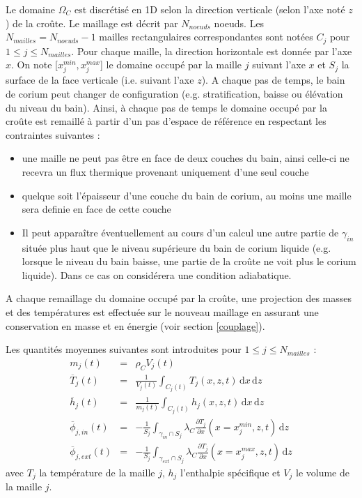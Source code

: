Le domaine $\Omega_C$ est discrétisé en 1D selon la direction verticale (selon l'axe noté $z$) de la croûte. Le maillage est décrit par $N_{noeuds}$ noeuds. Les $N_{mailles}=N_{noeuds}-1$ mailles rectangulaires correspondantes sont notées $C_j$ pour $1 \leq j\leq N_{mailles}$. Pour chaque maille, la direction horizontale est donnée par l'axe $x$. On note [$x_j^{min}, x_j^{max}$] le domaine occupé par la maille $j$ suivant l'axe $x$ et $S_j$ la surface de la face verticale (i.e. suivant l'axe $z$). A chaque pas de temps, le bain de corium peut changer de configuration (e.g. stratification, baisse ou élévation du niveau du bain). Ainsi, à chaque pas de temps le domaine occupé par la croûte est remaillé à partir d'un pas d'espace de référence en respectant les contraintes suivantes :
\begin{itemize}
    \item une maille ne peut pas être en face de deux couches du bain, ainsi celle-ci ne recevra un flux thermique provenant uniquement d'une seul couche
    \item quelque soit l'épaisseur d'une couche du bain de corium, au moins une maille sera definie en face de cette couche
    \item  Il peut apparaître éventuellement au cours d'un calcul une autre partie de $\gamma_{in}$ située plus haut que le niveau supérieure du bain de corium liquide (e.g. lorsque le niveau du bain baisse, une partie de la croûte ne voit plus le corium liquide). Dans ce cas on considérera une condition adiabatique.
\end{itemize}
A chaque remaillage du domaine occupé par la croûte, une projection des masses et des températures est effectuée sur le nouveau maillage en assurant une conservation en masse et en énergie (voir section \ref{couplage}).

Les quantités moyennes suivantes sont introduites pour $1 \leq j\leq N_{mailles}$ :
\begin{eqnarray}
m_{j}(t) &=& \rho_C  V_j(t) \\
\overline{T}_{j}(t) &=& \frac{1}{V_j(t)} \int_{C_j(t)} T_{j}(x,z,t)\,\mathrm{d}x\, \mathrm{d}z\\
\overline{h}_j(t) &=& \frac{1}{m_j(t)} \int_{C_j(t)} h_j(x,z,t)\,\mathrm{d}x\, \mathrm{d}z\\
\overline{\phi}_{j,in}(t) &=& -\frac{1}{S_j}\int_{\gamma_{in}\cap S_j}\lambda_C \frac{\partial T_{j}}{\partial x}(x=x_j^{min},z,t)\, \mathrm{d}z  \label{eq:phi_j_in}\\
\overline{\phi}_{j,ext}(t) &=& -\frac{1}{S_j}\int_{\gamma_{ext}\cap S_j}\lambda_C \frac{\partial T_{j}}{\partial x} (x=x_j^{max},z,t)\, \mathrm{d}z  \label{eq:phi_j_ext}
\end{eqnarray}
avec $T_{j}$ la température de la maille $j$, $h_j$ l'enthalpie spécifique et $V_j$ le volume de la maille $j$.\\

